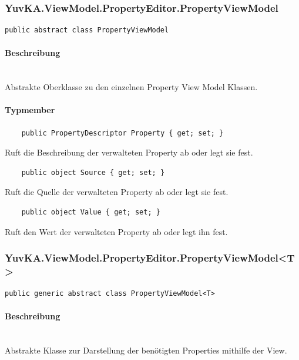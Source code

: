 \subsubsection{YuvKA.ViewModel.PropertyEditor.PropertyViewModel}

\begin{verbatim}
public abstract class PropertyViewModel
\end{verbatim}

\paragraph{Beschreibung}~\\
Abstrakte Oberklasse zu den einzelnen Property View Model Klassen.

\paragraph{Typmember}
\begin{itemize}
 	
	\begin{verbatim}
	public PropertyDescriptor Property { get; set; }
	\end{verbatim}
	Ruft die Beschreibung der verwalteten Property ab oder legt sie fest.

	\begin{verbatim}
	public object Source { get; set; }
	\end{verbatim}
	Ruft die Quelle der verwalteten Property ab oder legt sie fest.

	\begin{verbatim}
	public object Value { get; set; }
	\end{verbatim}
	Ruft den Wert der verwalteten Property ab oder legt ihn fest.

\end{itemize}




\subsubsection{YuvKA.ViewModel.PropertyEditor.PropertyViewModel<T>}

\begin{verbatim}
public generic abstract class PropertyViewModel<T>
\end{verbatim}

\paragraph{Beschreibung}~\\
Abstrakte Klasse zur Darstellung der benötigten Properties mithilfe der View.

